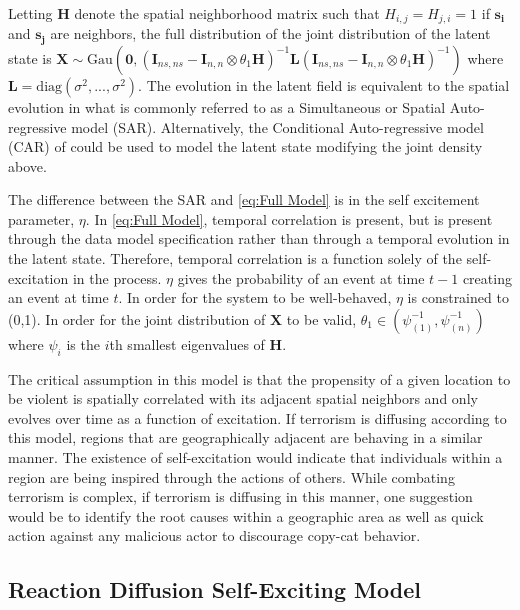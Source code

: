 \documentclass[11pt]{isuthesis}
\begin{document}
Letting $\boldsymbol{H}$ denote the spatial neighborhood matrix such that $H_{i,j}=H_{j,i}=1$ if $\boldsymbol{s_i}$ and $\boldsymbol{s_j}$ are neighbors, the full distribution of the joint distribution of the latent state is $\boldsymbol{X}\sim \mbox{Gau} (\boldsymbol{0},(\boldsymbol{I}_{ns,ns}-\boldsymbol{I}_{n,n} \otimes \theta_1\boldsymbol{H})^{-1}\boldsymbol{L}(\boldsymbol{I}_{ns,ns}-\boldsymbol{I}_{n,n} \otimes \theta_1\boldsymbol{H})^{-1})$ where $\boldsymbol{L}=\text{diag}(\sigma^2,...,\sigma^2)$.  The evolution in the latent field is equivalent to the spatial evolution in what is commonly referred to as a Simultaneous or Spatial Auto-regressive model (SAR).  Alternatively, the Conditional Auto-regressive model (CAR) of \cite{besag1974spatial} could be used to model the latent state modifying the joint density above.

The difference between the SAR and \eqref{eq:Full Model} is in the self excitement parameter, $\eta$.  In \eqref{eq:Full Model}, temporal correlation is present, but is present through the data model specification rather than through a temporal evolution in the latent state.  Therefore, temporal correlation is a function solely of the self-excitation in the process.  $\eta$ gives the probability of an event at time $t-1$ creating an event at time $t$.  In order for the system to be well-behaved, $\eta$ is constrained to (0,1).  In order for the joint distribution of $\boldsymbol{X}$ to be valid, $\theta_1 \in (\psi_{(1)}^{-1},\psi_{(n)}^{-1})$ where $\psi_{i}$ is the $i$th smallest eigenvalues of $\boldsymbol{H}$.

The critical assumption in this model is that the propensity of a given location to be violent is spatially correlated with its adjacent spatial neighbors and only evolves over time as a function of excitation.  If terrorism is diffusing according to this model, regions that are geographically adjacent are behaving in a similar manner.  The existence of self-excitation would indicate that individuals within a region are being inspired through the actions of others.  While combating terrorism is complex, if terrorism is diffusing in this manner, one suggestion would be to identify the root causes within a geographic area as well as quick action against any malicious actor to discourage copy-cat behavior.  


\subsection{Reaction Diffusion Self-Exciting Model}
\end{document}
